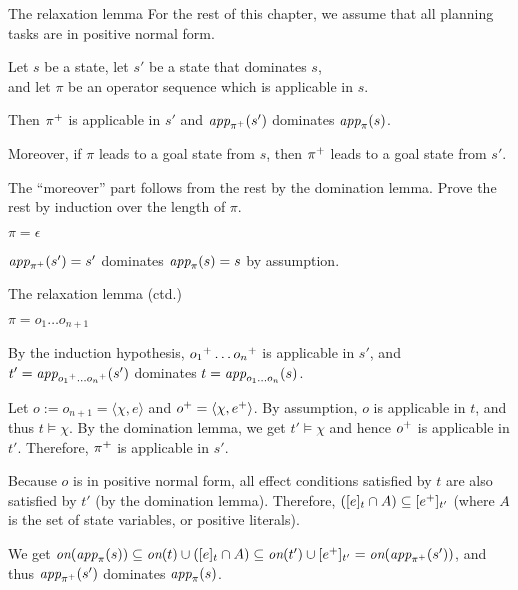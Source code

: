 \documentclass{gkibeamer}
\begin{document}
\begin{frame}{The relaxation lemma}
  For the rest of this chapter, we assume that all planning
  tasks are in positive normal form.
  \begin{lemma}[relaxation]
    Let $s$ be a state, let $s'$ be a state that dominates $s$, \\
    and let $\pi$ be an operator sequence which is applicable in $s$.
    
    Then ${\pi}^+$ is applicable in $s'$ and
    $\textit{app}_{{\pi}^+}(s')$ dominates
    $\textit{app}_{\pi}(s)$.

    Moreover, if $\pi$ leads to a goal state from $s$, then
    ${\pi}^+$ leads to a goal state from $s'$.
  \end{lemma}
  
  \begin{proofstart}
    The ``moreover'' part follows from the rest by the domination
    lemma. Prove the rest by induction over the length of $\pi$.

    \pause
    \smallskip

     $\pi = \epsilon$

    $\textit{app}_{{\pi}^+}(s') = s'$
    dominates $\textit{app}_{\pi}(s) = s$ by assumption.
  \end{proofstart}
\end{frame}

\begin{frame}{The relaxation lemma (ctd.)}
  \begin{proofend}
     $\pi = o_1\dots o_{n+1}$

    By the induction hypothesis,
    ${o_1}^+\dots{o_n}^+$
    is applicable in $s'$, and
    $t' = \textit{app}_{{o_1}^+\dots{o_n}^+}(s')$
    dominates
    $t = \textit{app}_{o_1 \dots o_n}(s)$.
    
    \pause
    \smallskip
    
    Let $o := o_{n+1} = \langle \chi,e\rangle$
    and ${o}^+ = \langle \chi, e^+\rangle$.
    By assumption, $o$ is applicable in $t$, and thus
    $t \models \chi$. By the domination lemma, we get $t' \models \chi$
    and hence ${o}^+$ is applicable in $t'$.
    Therefore, ${\pi}^+$ is applicable in $s'$.
    
    \pause
    \smallskip
    
    Because $o$ is in positive normal form, all effect conditions
    satisfied by $t$ are also satisfied by $t'$ (by the domination
    lemma). Therefore, $(\lbrack e\rbrack_{t} \cap A) \subseteq
    \lbrack e^+\rbrack_{t'}$ (where $A$ is the set of state variables, or
    positive literals).
   
    \pause
    \smallskip
    
    We get
    $\textit{on}(\textit{app}_{\pi}(s))
    \subseteq \textit{on}(t) \cup (\lbrack e\rbrack_{t} \cap A)
    \subseteq \textit{on}(t') \cup \lbrack e^+\rbrack_{t'}
    = \textit{on}(\textit{app}_{{\pi}^+}(s'))$,
    and thus
    $\textit{app}_{{\pi}^+}(s')$ dominates
    $\textit{app}_{\pi}(s)$.
  \end{proofend}
\end{frame}
\end{document}
